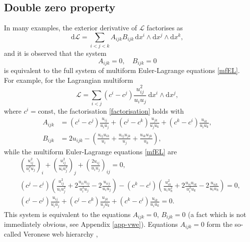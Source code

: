 \documentclass[12pt, a4paper]{article}
\theoremstyle{definition}
\renewcommand{\d}{\mathrm{d}}
\newcommand{\cL}{\mathcal{L}}
\begin{document}
\subsection{Double zero property}

In many examples, the exterior derivative of $\cL$ factorises as
\begin{equation}
	\label{factorisation}
	\d \cL =\sum_{i<j<k} A_{ijk}B_{ijk}\, \d x^i \wedge \d x^j\wedge \d x^k,
\end{equation}
and it is observed that the system
\begin{equation}
	\label{ABsystem}
	A_{ijk}=0,\quad B_{ijk}=0
\end{equation}
is equivalent to the full system of multiform Euler-Lagrange equations \eqref{mfEL}. 
For example, for the Lagrangian multiform 
\begin{equation}\label{LMF}
	\cL = \sum_{i<j}(c^i-c^j)\frac{u_{ij}^2}{u_iu_j}\ \d x^i\wedge \d x^j,
\end{equation}
where $c^i=\text{const}$, the factorisation \eqref{factorisation} holds with
\begin{align*}
	A_{ijk} &= (c^i-c^j)\frac{u_{ij}}{u_iu_j}+(c^j-c^k)\frac{u_{jk}}{u_ju_k}+(c^k-c^i)\frac{u_{ik}}{u_iu_k}, \\
	B_{ijk} &= 2 u_{ijk} - \left(\frac{u_{ij}u_{ik}}{u_i}+\frac{u_{ij}u_{jk}}{u_j}+\frac{u_{ik}u_{jk}}{u_k} \right),
\end{align*}
while the multiform Euler-Lagrange equations  \eqref{mfEL} are
\begin{subequations} 
	\label{vweEL}
	\begin{align}
		&\!\left(\frac{u_{ij}^2}{u_i^2u_j}\right)_i+\left(\frac{u_{ij}^2}{u_iu_j^2}\right)_j+\left(\frac{2u_{ij}}{u_iu_j}\right)_{ij}=0, \label{vweEL1}\\
		&(c^j - c^i) \left( \frac{u_{ij}^2}{u_i u_j^2} + 2 \frac{u_{ii}u_{ij}}{u_i^2 u_j} - 2 \frac{u_{iij}}{u_i u_j}\right)  - (c^k - c^i) \left( \frac{u_{ik}^2}{u_i u_k^2} + 2 \frac{u_{ii}u_{ik}}{u_i^2 u_k} - 2 \frac{u_{iik}}{u_i u_k}\right) = 0,  \label{vweEL2}
		\\
		& (c^i-c^j)\frac{u_{ij}}{u_iu_j}+(c^j-c^k)\frac{u_{jk}}{u_ju_k}+(c^k-c^i)\frac{u_{ik}}{u_iu_k} = 0 . \label{vweEL3}
	\end{align}
\end{subequations}
This system is equivalent to the  equations $A_{ijk} = 0$, $B_{ijk} = 0$ (a fact which is not immediately obvious, see Appendix \ref{app-vwe}).
Equations $A_{ijk}=0$ form the so-called Veronese web hierarchy \cite{zakharevich2000nonlinear},
\end{document}
